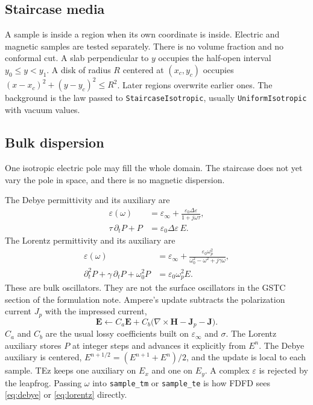 \documentclass[11pt,a4paper]{article}
\begin{document}
\subsection{Staircase media}
\label{sec:staircase}

A sample is inside a region when its own coordinate is inside. Electric and
magnetic samples are tested separately. There is no volume fraction and no
conformal cut. A slab perpendicular to $y$ occupies the half-open interval
$y_0\le y<y_1$. A disk of radius $R$ centered at $(x_c,y_c)$ occupies
$(x-x_c)^2+(y-y_c)^2\le R^2$. Later regions overwrite earlier ones. The
background is the law passed to \texttt{StaircaseIsotropic}, usually
\texttt{UniformIsotropic} with vacuum values.

\subsection{Bulk dispersion}
\label{sec:dispersion}

One isotropic electric pole may fill the whole domain. The staircase does
not yet vary the pole in space, and there is no magnetic dispersion.

The Debye permittivity and its auxiliary are
\begin{align}
\varepsilon(\omega)
&= \varepsilon_\infty + \frac{\varepsilon_0\Delta\varepsilon}{1+j\omega\tau},
\label{eq:debye}\\
\tau\,\partial_t P + P &= \varepsilon_0\Delta\varepsilon\, E.
\label{eq:debye-ode}
\end{align}
The Lorentz permittivity and its auxiliary are
\begin{align}
\varepsilon(\omega)
&= \varepsilon_\infty
 + \frac{\varepsilon_0\omega_p^2}{\omega_0^2-\omega^2+j\gamma\omega},
\label{eq:lorentz}\\
\partial_t^2 P + \gamma\,\partial_t P + \omega_0^2 P
&= \varepsilon_0\omega_p^2 E.
\label{eq:lorentz-ode}
\end{align}
These are bulk oscillators. They are not the surface oscillators in the
GSTC section of the formulation note. Ampere's update subtracts the
polarization current $J_p$ with the impressed current,
\begin{equation}
\mathbf{E}
\leftarrow C_a\mathbf{E}
 + C_b\big(\nabla\times\mathbf{H}-\mathbf{J}_p-\mathbf{J}\big).
\label{eq:jp}
\end{equation}
$C_a$ and $C_b$ are the usual lossy coefficients built on
$\varepsilon_\infty$ and $\sigma$. The Lorentz auxiliary stores $P$ at
integer steps and advances it explicitly from $E^n$. The Debye auxiliary is
centered, $E^{n+1/2}=(E^{n+1}+E^n)/2$, and the update is local to each
sample. TEz keeps one auxiliary on $E_x$ and one on $E_y$. A complex
$\varepsilon$ is rejected by the leapfrog. Passing $\omega$ into
\texttt{sample\_tm} or \texttt{sample\_te} is how FDFD sees
\eqref{eq:debye} or \eqref{eq:lorentz} directly.
\end{document}
